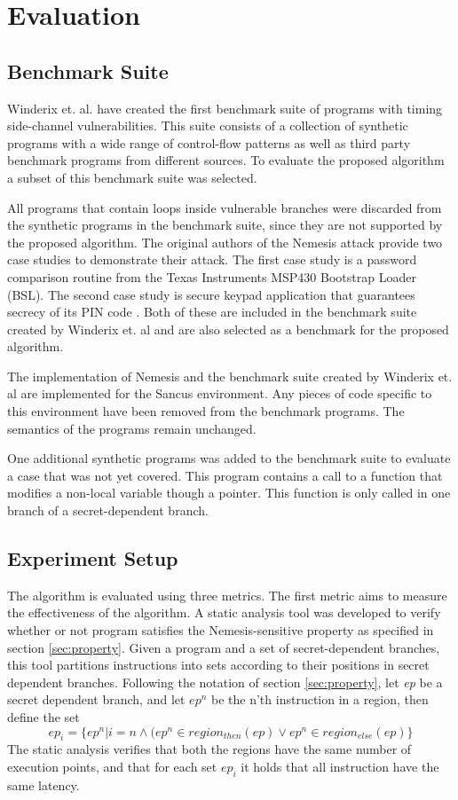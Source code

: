 
\chapter{Evaluation}
\section{Benchmark Suite}
Winderix et. al. \cite{WinderixHans} have created the first benchmark suite of programs with timing side-channel vulnerabilities. This suite consists of a 
collection of synthetic programs with a wide range of control-flow patterns as well as third party benchmark programs from different sources. 
To evaluate the proposed algorithm a subset of this benchmark suite was selected. 

All programs that contain loops inside vulnerable branches were discarded from the synthetic programs in the benchmark suite, 
since they are not supported by the proposed algorithm. 
The original authors of the Nemesis attack provide two case studies to demonstrate their attack. 
The first case study is a password comparison routine from the Texas Instruments MSP430 Bootstrap Loader (BSL). 
The second case study is secure keypad application that guarantees secrecy of its PIN code \cite{Nemesis}.
Both of these are included in the benchmark suite created by Winderix et. al and are also selected as a benchmark for the proposed algorithm. 

The implementation of Nemesis and the benchmark suite created by Winderix et. al are implemented for the Sancus environment. Any pieces of code specific to this
environment have been removed from the benchmark programs. The semantics of the programs remain unchanged. 

One additional synthetic programs was added to the benchmark suite to evaluate a case that was not yet covered. This program contains a call to a function that 
modifies a non-local variable though a pointer. This function is only called in one branch of a secret-dependent branch. 

\section{Experiment Setup}
The algorithm is evaluated using three metrics. The first metric aims to measure the effectiveness of the algorithm. A static analysis tool was developed to verify 
whether or not program satisfies the Nemesis-sensitive property as specified in section \ref{sec:property}.
Given a program and a set of secret-dependent branches, this tool partitions instructions into sets according to their positions in secret dependent branches. Following the notation of section \ref{sec:property}, let \textit{ep} be a secret dependent branch, and let $ep^n$ be the n'th instruction in a region, then define the set 
\begin{equation} \label{eq:toolSets}
    ep_i = \{ ep^n |i = n \land  (ep^n \in region_{then}(ep) \lor ep^n \in region_{else}(ep)\}
\end{equation}
The static analysis verifies that both the regions have the same number of execution points, and that for each set $ep_i$ it holds that all 
instruction have the same latency.

